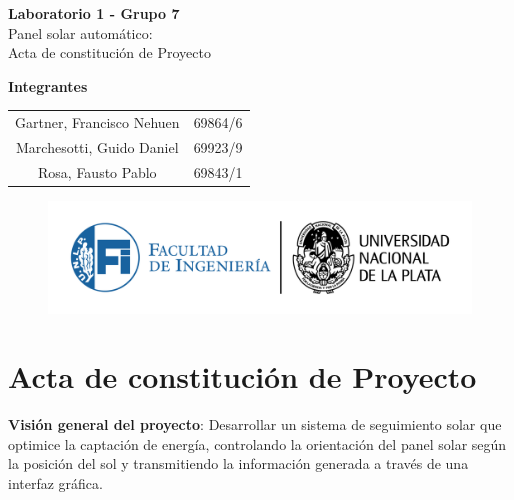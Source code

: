 \documentclass[a4paper,12pt]{article}
\begin{document}
\begin{titlepage}
    \begin{center}
        \vspace*{3cm}
        
        {\Huge \textbf{Laboratorio 1 - Grupo 7}}\\[1cm]
        {\LARGE Panel solar automático:\\ [0.5cm]Acta de constitución de Proyecto}\\[2cm]
        
        \vfill
        
        {\Large \textbf{Integrantes }}\\[.5cm]
        \large
        \begin{tabular}{c c}
            Gartner, Francisco Nehuen & 69864/6 \\
            Marchesotti, Guido Daniel & 69923/9 \\
            Rosa, Fausto Pablo & 69843/1 \\
        \end{tabular}
        
        \vspace{1cm}
        
        \begin{figure}[b]
            \centering
            \includegraphics[width=1\linewidth]{LOGOSFI-UNLP-color-01.png}
        \end{figure}
        
    \end{center}
\end{titlepage}


\section{Acta de constitución de Proyecto}

\hspace{0.4cm}\textbf{ Visión general del proyecto}: 
Desarrollar un sistema de seguimiento solar que optimice la captación de energía, controlando la orientación del panel solar según la posición del sol y transmitiendo la información generada a través de una interfaz gráfica.
\end{document}

